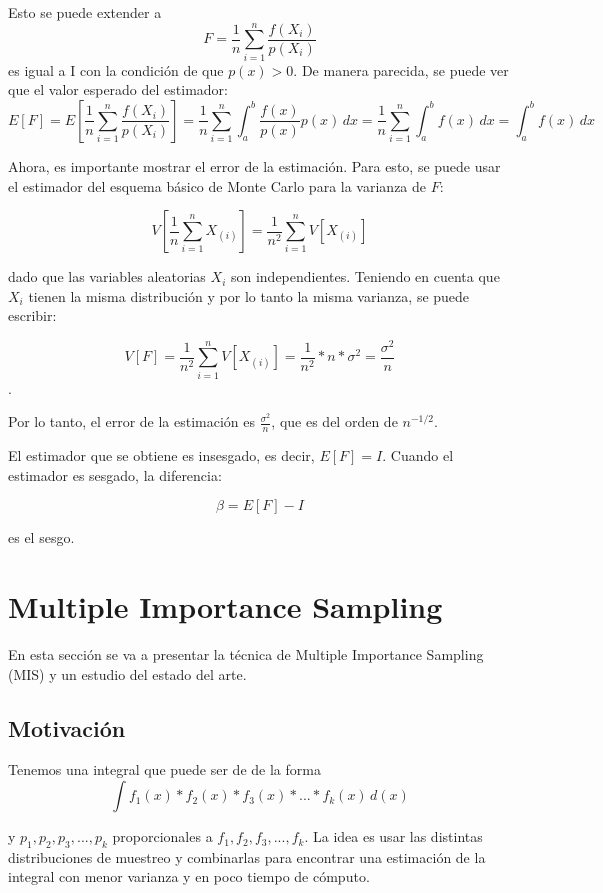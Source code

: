 \documentclass{article}
\begin{document}
Esto se puede extender a
$$ F = \frac{1}{n} \sum_{i=1}^{n} \frac{f(X_i)}{p(X_i)}$$
es igual a I con la condición de que $p(x) > 0$. De manera parecida, se puede ver que el valor esperado del estimador:
$$E[F] = E\left[\frac{1}{n} \sum_{i=1}^{n} \frac{f(X_i)}{p(X_i)}\right] = \frac{1}{n} \sum_{i=1}^{n} \int_{a}^{b} \frac{f(x)}{p(x)} p(x) \,dx = \frac{1}{n} \sum_{i=1}^{n} \int_{a}^{b} f(x) \,dx = \int_{a}^{b} f(x) \,dx$$

Ahora, es importante mostrar el error de la estimación. Para esto, se puede usar el estimador del esquema básico de Monte Carlo para la varianza de $F$:

$$V[\frac{1}{n}\sum_{i=1}^{n} X_{(i)}] = \frac{1}{n^{2}} \sum_{i=1}^{n} V[X_{(i)}]$$

dado que las variables aleatorias $X_{i}$ son independientes. Teniendo en cuenta que $X_{i}$ tienen la misma distribución y por lo tanto la misma varianza, se puede escribir:

$$V[F] = \frac{1}{n^{2}} \sum_{i=1}^{n} V[X_{(i)}] = \frac{1}{n^{2}} * n * \sigma^{2} = \frac{\sigma^{2}}{n}$$.

Por lo tanto, el error de la estimación es $\frac{\sigma^{2}}{n}$, que es del orden de $n^{-1/2}$.

El estimador que se obtiene es insesgado, es decir, $E[F] = I$. Cuando el estimador es sesgado, la diferencia:

$$\beta = E[F] - I$$

es el sesgo.

\section{Multiple Importance Sampling}

En esta sección se va a presentar la técnica de Multiple Importance Sampling (MIS) y un estudio del estado del arte.

\subsection{Motivación}

Tenemos una integral que puede ser de de la forma
$$ \int f_{1}(x) * f_{2}(x) * f_{3}(x) * ... * f_{k}(x) \,d(x)$$

y $ p_{1}, p_{2}, p_{3}, ..., p_{k}$ proporcionales a $f_{1}, f_{2}, f_{3}, ..., f_{k}$.
La idea es usar las distintas distribuciones de muestreo y combinarlas para encontrar una estimación de la integral con menor varianza y en poco tiempo de cómputo.
\end{document}
